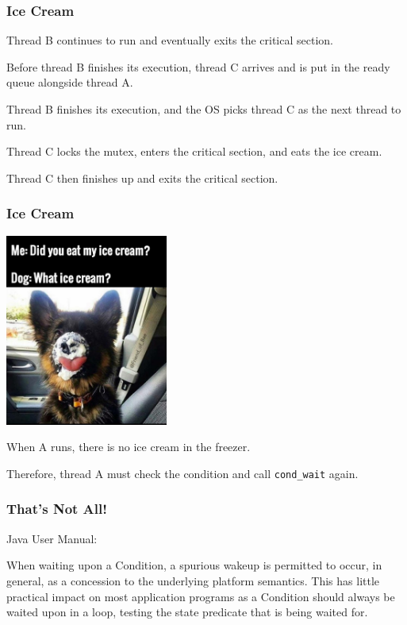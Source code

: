 \begin{frame}[fragile]
	\frametitle{Ice Cream}

	Thread B continues to run and eventually exits the critical section.

	Before thread B finishes its execution, thread C arrives and is put in the ready queue alongside thread A.

	Thread B finishes its execution, and the OS picks thread C as the next thread to run.

	Thread C locks the mutex, enters the critical section, and eats the ice cream.

	Thread C then finishes up and exits the critical section.

\end{frame}

\begin{frame}[fragile]
	\frametitle{Ice Cream}

	\begin{center}
		\includegraphics[width=0.4\textwidth]{images/icecream}
	\end{center}

	When A runs, there is no ice cream in the freezer.

	Therefore, thread A must check the condition and call \texttt{cond\_wait} again.

\end{frame}

\begin{frame}[fragile]
	\frametitle{That's Not All!}

	Java User Manual:

	\vspace{1em}
	\begin{displayquote}
		When waiting upon a Condition, a spurious wakeup is permitted to occur, in general, as a concession to the underlying platform semantics.
		This has little practical impact on most application programs as a Condition should always be waited upon in a loop, testing the state predicate that is being waited for.
	\end{displayquote}

\end{frame}

